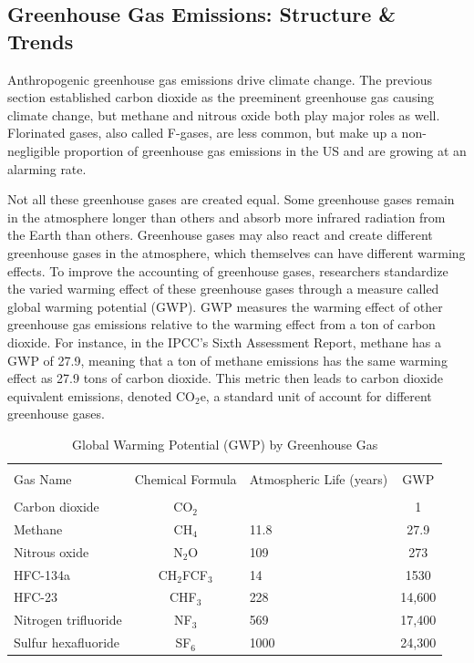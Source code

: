 \subsection{Greenhouse Gas Emissions: Structure \& Trends}

Anthropogenic greenhouse gas emissions drive climate change. The previous section established carbon dioxide as the preeminent greenhouse gas causing climate change, but methane and nitrous oxide both play major roles as well. Florinated gases, also called F-gases, are less common, but make up a non-negligible proportion of greenhouse gas emissions in the US and are growing at an alarming rate.

Not all these greenhouse gases are created equal. Some greenhouse gases remain in the atmosphere longer than others and absorb more infrared radiation from the Earth than others. Greenhouse gases may also react and create different greenhouse gases in the atmosphere, which themselves can have different warming effects. To improve the accounting of greenhouse gases, researchers standardize the varied warming effect of these greenhouse gases through a measure called global warming potential (GWP). GWP measures the warming effect of other greenhouse gas emissions relative to the warming effect from a ton of carbon dioxide. For instance, in the IPCC's Sixth Assessment Report, methane has a GWP of 27.9, meaning that a ton of methane emissions has the same warming effect as 27.9 tons of carbon dioxide. This metric then leads to carbon dioxide equivalent emissions, denoted CO$_2$e, a standard unit of account for different greenhouse gases.

\begin{table}
\centering
\caption{Global Warming Potential (GWP) by Greenhouse Gas \label{gwptable}}
\begin{tabular}{l c C{3cm} c}
	\hline\\[-1.8ex]
	Gas Name & Chemical Formula & Atmospheric Life (years) & GWP\\ 
	\hline\\[-1.8ex]
	Carbon dioxide & CO$_2$ &  & 1 \\
	Methane & CH$_4$ & 11.8 & 27.9\\
	Nitrous oxide & N$_2$O & 109 & 273\\
	HFC-134a & CH$_2$FCF$_3$ & 14 & 1530\\ 
	HFC-23 & CHF$_3$ & 228 & 14,600\\
	Nitrogen trifluoride & NF$_3$ & 569 & 17,400\\
	Sulfur hexafluoride & SF$_6$ & 1000 & 24,300\\
	\hline
\end{tabular}\\
\vspace{.6em}
\end{table}

